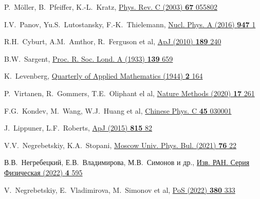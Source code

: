 \begin{thebibliography}{9}
P.~M\"oller, B.~Pfeiffer, K.-L.~Kratz,
\href{https://link.aps.org/doi/10.1103/PhysRevC.67.055802}
  {Phys. Rev. C (2003) \textbf{67} 055802}

I.V.~Panov, Yu.S.~Lutostansky, F.-K.~Thielemann,
\href{hhttps://doi.org/10.1016/j.nuclphysa.2015.12.001}
  {Nucl. Phys. A (2016) \textbf{947} 1}

R.H.~Cyburt, A.M.~Amthor, R.~Ferguson et al,
\href{https://doi.org/10.1088/0067-0049/189/1/240}
  {ApJ (2010) \textbf{189} 240}

B.W.~Sargent,
\href{https://doi.org/10.1098/rspa.1933.0045}
  {Proc. R. Soc. Lond. A (1933) \textbf{139} 659}

K.~Levenberg,
\href{https://doi.org/10.1090/qam/10666}
  {Quarterly of Applied Mathematics (1944) \textbf{2} 164}

P.~Virtanen, R.~Gommers, T.E.~Oliphant el al,
\href{https://doi.org/10.1038/s41592-019-0686-2}
  {Nature Methods (2020) \textbf{17} 261}

 F.G.~Kondev, M.~Wang, W.J.~Huang et al,
 \href{https://doi.org/10.1088/1674-1137/abddae}
  {Chinese Phys. C \textbf{45} 030001}

J.~Lippuner, L.F.~Roberts, 
\href{http://dx.doi.org/10.1088/0004-637X/815/2/82}
  {ApJ (2015) \textbf{815} 82}

V.V.~Negrebetskiy, K.A.~Stopani, 
\href{http://dx.doi.org/10.3103/S0027134921010082}
  {Moscow Univ. Phys. Bul. (2021) \textbf{76} 22}

В.В.~Негребецкий, Е.В.~Владимирова, М.В.~Симонов и др., 
\href{http://dx.doi.org/10.31857/S0367676522040184}
  {Изв. РАН. Серия Физическая (2022) \textbf{4} 595}

V.~Negrebetskiy, E.~Vladimirova, M.~Simonov et al,
\href{https://dx.doi.org/10.22323/1.380.0333 }
  {PoS (2022) \textbf{380} 333}
\end{thebibliography}
